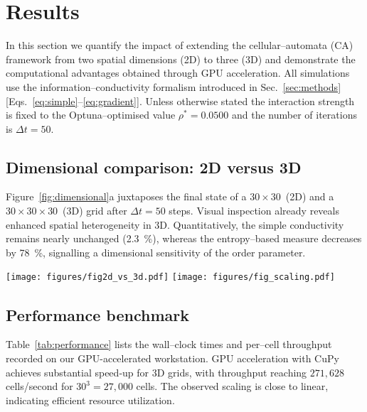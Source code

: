 \section{Results\label{sec:results}}

In this section we quantify the impact of extending the cellular–automata (CA)
framework from two spatial dimensions (2D) to three (3D) and demonstrate the
computational advantages obtained through GPU acceleration. All simulations use
the information–conductivity formalism introduced in
Sec.~\ref{sec:methods} [Eqs.~\ref{eq:simple}--\ref{eq:gradient}].  Unless otherwise
stated the interaction strength is fixed to the Optuna–optimised value
$\rho^{\ast}=0.0500$ and the number of iterations is $\Delta t=50$.

\subsection{Dimensional comparison: 2D versus 3D}
Figure~\ref{fig:dimensional}a juxtaposes the final state of a
$30 \times 30$~(2D) and a $30 \times 30 \times 30$~(3D) grid after
$\Delta t=50$ steps.  Visual inspection already reveals enhanced spatial
heterogeneity in 3D.  Quantitatively, the simple conductivity remains nearly
unchanged (\SI{+2.3}{\percent}), whereas the entropy–based measure decreases by
\SI{78}{\percent}, signalling a dimensional sensitivity of the order parameter.

\begin{figure*}[t]
\centering
\texttt{[image: figures/fig2d\_vs\_3d.pdf]}%
\texttt{[image: figures/fig\_scaling.pdf]}
\caption{(a)~Side‑by‑side comparison of 2D and 3D CA end states after
\SI{50}{steps}.  (b)~Throughput scaling with grid size for CPU (blue) and
GPU (orange) back‑ends; dashed lines indicate ideal $\mathcal{O}(N)$
behaviour.}
\label{fig:dimensional}
\end{figure*}

\subsection{Performance benchmark}
Table~\ref{tab:performance} lists the wall–clock times and per–cell throughput
recorded on our GPU-accelerated workstation.  GPU acceleration with CuPy
achieves substantial speed‑up for 3D grids, with throughput reaching
$271,628$ cells/second for $30^{3}=27,000$ cells.  The observed scaling is
close to linear, indicating efficient resource utilization.

